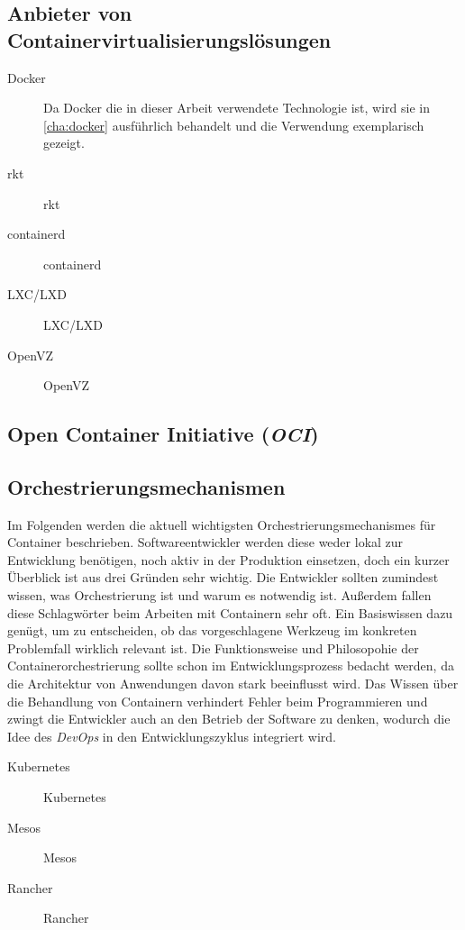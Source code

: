 
\subsection{Anbieter von Containervirtualisierungslösungen}
\label{sec:container-solutions}
\begin{description}
    \item [Docker] Da Docker die in dieser Arbeit verwendete Technologie ist, wird sie in \cref{cha:docker} ausführlich behandelt und die Verwendung exemplarisch gezeigt.
    \item [rkt] rkt
    \item [containerd] containerd
    \item [LXC/LXD] LXC/LXD
    \item [OpenVZ] OpenVZ
\end{description}
\subsection{Open Container Initiative (\emph{OCI})}
\label{sec:open-container-initiative}
\subsection{Orchestrierungsmechanismen}
\label{sec:orchestrierungsmechanismen}
Im Folgenden werden die aktuell wichtigsten Orchestrierungsmechanismes für Container beschrieben.
Softwareentwickler werden diese weder lokal zur Entwicklung benötigen, noch aktiv in der Produktion einsetzen, doch ein kurzer Überblick ist aus drei Gründen sehr wichtig.
Die Entwickler sollten zumindest wissen, was Orchestrierung ist und warum es notwendig ist.
Außerdem fallen diese Schlagwörter beim Arbeiten mit Containern sehr oft. Ein Basiswissen dazu genügt, um zu entscheiden, ob das vorgeschlagene Werkzeug im konkreten Problemfall wirklich relevant ist.
Die Funktionsweise und Philosopohie der Containerorchestrierung sollte schon im Entwicklungsprozess bedacht werden, da die Architektur von Anwendungen davon stark beeinflusst wird.
Das Wissen über die Behandlung von Containern verhindert Fehler beim Programmieren und zwingt die Entwickler auch an den Betrieb der Software zu denken, wodurch die Idee des \emph{DevOps} in den Entwicklungszyklus integriert wird.

\begin{description}
    \item [Kubernetes] Kubernetes
    \item [Mesos] Mesos
    \item [Rancher] Rancher
\end{description}
